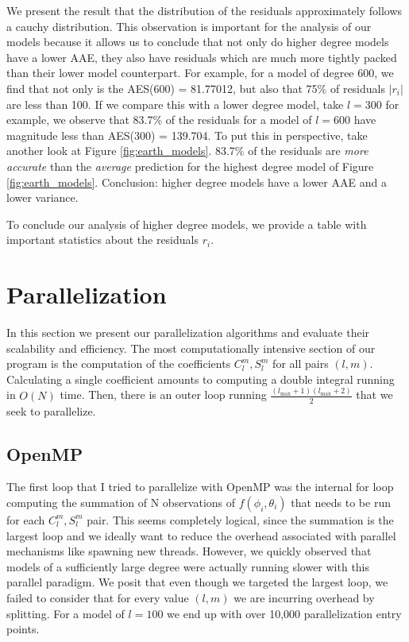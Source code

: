 \documentclass[a4paper]{article}
\theoremstyle{definition}
\begin{document}
We present the result that the distribution of the residuals approximately follows a cauchy distribution. This observation is important for the analysis of our 
models because it allows us to conclude that not only do higher degree models have a lower AAE, they also have residuals which are much more tightly packed than their
lower model counterpart. For example, for a model of degree 600, we find that not only is the AES(600) = 81.77012, but also that 75$\%$ of residuals $|r_i|$ are less
than 100. If we compare this with a lower degree model, take $l = 300$ for example, we observe that 83.7\% of the residuals for a model of $l = 600$ have magnitude less 
than AES(300) = 139.704. To put this in perspective, take another look at Figure \ref{fig:earth_models}. 83.7\% of the residuals are \textit{more accurate} than the \textit{average}
prediction for the highest degree model of Figure \ref{fig:earth_models}. Conclusion: higher degree models have a lower AAE and a lower variance.

To conclude our analysis of higher degree models, we provide a table with important statistics about the residuals $r_i$.

\section{Parallelization} 

In this section we present our parallelization algorithms and evaluate their scalability and efficiency. The most computationally
intensive section of our program is the computation of the coefficients $C_l^m, S_l^m$ for all pairs $(l, m)$. Calculating a single 
coefficient amounts to computing a double integral running in $O(N)$ time. Then, there is an outer loop running $\frac{(l_\mathrm{max} + 1)(l_\mathrm{max} + 2)}{2}$
that we seek to parallelize.

\subsection{OpenMP}

The first loop that I tried to parallelize with OpenMP was the internal for loop computing the summation of N observations of $f(\phi_i, \theta_i)$ that needs to be run for each $C_l^m, S_l^m$ pair. 
This seems completely logical, since the summation is the largest loop and we ideally want to reduce the overhead associated with parallel mechanisms like spawning new threads. 
However, we quickly observed that models of a sufficiently large degree were actually running slower with this parallel paradigm. We posit that even though we targeted the largest loop,
we failed to consider that for every value $(l, m)$ we are incurring overhead by splitting. For a model of $l = 100$ we end up with over 10,000 parallelization entry points.
\end{document}
